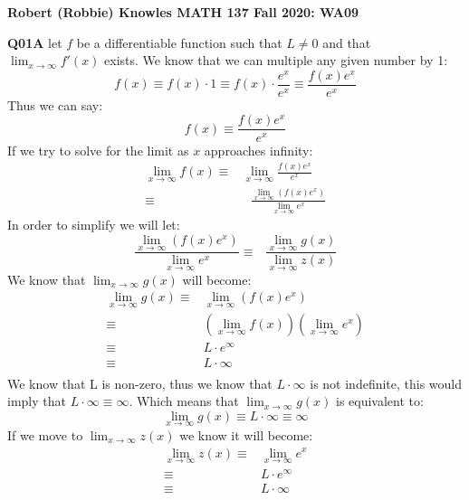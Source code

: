 \documentclass[11pt]{article}
\begin{document}
\parindent=0pt

\textbf{Robert (Robbie) Knowles MATH 137 Fall 2020: WA09}

\textbf{Q01A} let $f$ be a differentiable function such that $L \neq 0$ and that $\displaystyle{\lim_{x \to \infty}} f'(x)$ exists. We know that we can multiple any given number by 1:
\[ f(x) \equiv f(x) \cdot 1 \equiv f(x) \cdot \frac{e^x}{e^x}  \equiv \frac{f(x)e^x}{e^x} \]
Thus we can say:
\[ f(x)  \equiv \frac{f(x)e^x}{e^x} \]
If we try to solve for the limit as $x$ approaches infinity: 
\begin{align*}
 \lim_{x \to \infty} f(x) \equiv & \lim_{x \to \infty} \frac{f(x)e^x}{e^x}  \\
                                     \equiv &   \text{ } \frac{\displaystyle{\lim_{x \to \infty}} (f(x)e^x)}{\displaystyle{\lim_{x \to \infty}} e^x}   
\end{align*}
In order to simplify we will let:
\[   \frac{\displaystyle{\lim_{x \to \infty}} (f(x)e^x)}{\displaystyle{\lim_{x \to \infty}} e^x}  \equiv  \text{ } \frac{\displaystyle{\lim_{x \to \infty}} g(x)}{\displaystyle{\lim_{x \to \infty}} z(x)}\]
We know that  $\displaystyle{\lim_{x \to \infty}} g(x)$ will become:
\begin{align*} 
 \displaystyle{\lim_{x \to \infty}} g(x) \equiv & \displaystyle{\lim_{x \to \infty}} (f(x)e^x) \\
                                                             \equiv & (\displaystyle{\lim_{x \to \infty}} f(x)) (\displaystyle{\lim_{x \to \infty}} e^x) \\
                                                             \equiv & L \cdot e^\infty \\
                                                             \equiv & L \cdot \infty \\
\end{align*}
We know that L is non-zero, thus we know that $L \cdot \infty$ is not indefinite, this would imply that $L \cdot \infty \equiv \infty$. Which means that $\displaystyle{\lim_{x \to \infty}} g(x)$ is equivalent to:
\[ \displaystyle{\lim_{x \to \infty}} g(x) \equiv L \cdot \infty \equiv \infty \]
If we move to $\displaystyle{\lim_{x \to \infty}} z(x)$ we know it will become:
\begin{align*} 
 \displaystyle{\lim_{x \to \infty}} z(x) \equiv & \displaystyle{\lim_{x \to \infty}} e^x \\
                                                             \equiv & L \cdot e^\infty \\
                                                             \equiv & L \cdot \infty \\
\end{align*}
\end{document}
